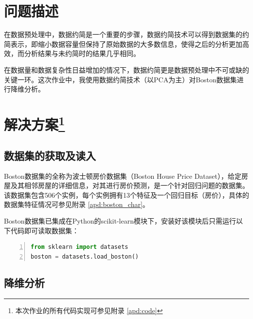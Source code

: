 \documentclass[12pt,a4paper]{article}
\theoremstyle{definition}
\begin{document}
\noindent
\noindent{}

\section{问题描述}

在数据预处理中，数据约简是一个重要的步骤，数据约简技术可以得到数据集的约简表示，即缩小数据容量但保持了原始数据的大多数信息，使得之后的分析更加高效，而分析结果与未约简时的结果几乎相同。

在数据量和数据复杂性日益增加的情况下，数据约简更是数据预处理中不可或缺的关键一环。这次作业中，我使用数据约简技术（以PCA为主）对Boston数据集进行降维分析。

\section{解决方案\protect\footnote{本次作业的所有代码实现可参见附录 \ref{apd:code}}}

\subsection{数据集的获取及读入}

Boston数据集的全称为波士顿房价数据集（Boston House Price Dataset），给定房屋及其相邻房屋的详细信息，对其进行房价预测，是一个针对回归问题的数据集。该数据集包含506个实例，每个实例拥有13个特征及一个回归目标（房价），具体的数据集特征情况可参见附录 \ref{apd:boston_char}。

Boston数据集已集成在Python的scikit-learn模块下，安装好该模块后只需运行以下代码即可读取数据集：

\vspace{0.01\linewidth}

\begin{lstlisting}[language=Python,
numbers=left,
keywordstyle=\color{blue!70},
frame=shadowbox,
breaklines=True]
from sklearn import datasets
boston = datasets.load_boston()
\end{lstlisting}

\subsection{降维分析}
\end{document}

